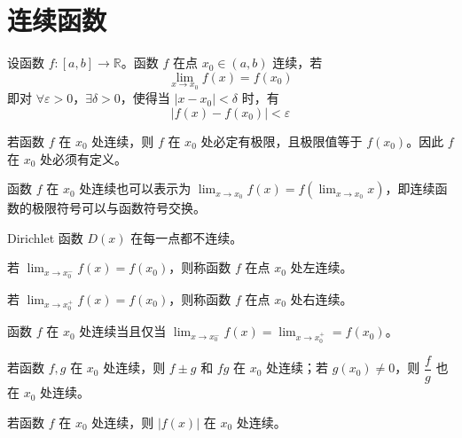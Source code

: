 
\section{连续函数}

\begin{definition}
    设函数 $f: [a, b] \to \mathbb{R}$。函数 $f$ 在点 $x_0 \in (a, b)$ 连续，若
    \[\lim_{x \to x_0}f(x) = f(x_0)\]
    即对 $\forall \varepsilon > 0$，$\exists \delta > 0$，使得当 $|x - x_0| < \delta$ 时，有
    \[|f(x) - f(x_0)| < \varepsilon\]
\end{definition}

\begin{remark}
    若函数 $f$ 在 $x_0$ 处连续，则 $f$ 在 $x_0$ 处必定有极限，且极限值等于 $f(x_0)$。因此 $f$ 在 $x_0$ 处必须有定义。
\end{remark}

\begin{remark}
  函数 $f$ 在 $x_0$ 处连续也可以表示为 $\displaystyle \lim_{x \to x_0}f(x) = f(\lim_{x \to x_0}x)$，即连续函数的极限符号可以与函数符号交换。
\end{remark}

\hfill

\begin{example}
    Dirichlet 函数 $D(x)$ 在每一点都不连续。
\end{example}

\hfill

\begin{definition}
    若 $\displaystyle \lim_{x \to x_{0}^{-}}f(x) = f(x_0)$，则称函数 $f$ 在点 $x_0$ 处左连续。

    若 $\displaystyle \lim_{x \to x_{0}^{+}}f(x) = f(x_0)$，则称函数 $f$ 在点 $x_0$ 处右连续。
\end{definition}

\begin{theorem}
    函数 $f$ 在 $x_0$ 处连续当且仅当 $\displaystyle \lim_{x \to x_{0}^{-}}f(x) = \lim_{x \to x_{0}^{+}} = f(x_0)$。
\end{theorem}

\begin{theorem}
    若函数 $f, g$ 在 $x_0$ 处连续，则 $f \pm g$ 和 $fg$ 在 $x_0$ 处连续；若 $g(x_0) \neq 0$，则 $\dfrac{f}{g}$ 也在 $x_0$ 处连续。
\end{theorem}

\begin{theorem}
    若函数 $f$ 在 $x_0$ 处连续，则 $|f(x)|$ 在 $x_0$ 处连续。
\end{theorem}

